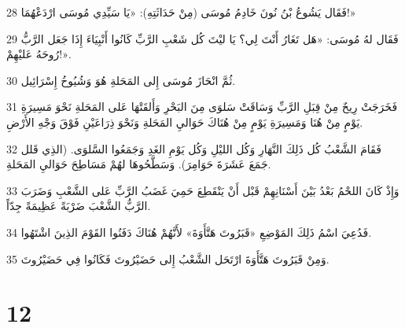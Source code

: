 \par 28 فَقَال يَشُوعُ بْنُ نُونَ خَادِمُ مُوسَى (مِنْ حَدَاثَتِهِ): «يَا سَيِّدِي مُوسَى ارْدَعْهُمَا!»
\par 29 فَقَال لهُ مُوسَى: «هَل تَغَارُ أَنْتَ لِي؟ يَا ليْتَ كُل شَعْبِ الرَّبِّ كَانُوا أَنْبِيَاءَ إِذَا جَعَل الرَّبُّ رُوحَهُ عَليْهِمْ!».
\par 30 ثُمَّ انْحَازَ مُوسَى إِلى المَحَلةِ هُوَ وَشُيُوخُ إِسْرَائِيل.
\par 31 فَخَرَجَتْ رِيحٌ مِنْ قِبَلِ الرَّبِّ وَسَاقَتْ سَلوَى مِنَ البَحْرِ وَأَلقَتْهَا عَلى المَحَلةِ نَحْوَ مَسِيرَةِ يَوْمٍ مِنْ هُنَا وَمَسِيرَةِ يَوْمٍ مِنْ هُنَاكَ حَوَاليِ المَحَلةِ وَنَحْوَ ذِرَاعَيْنِ فَوْقَ وَجْهِ الأَرْضِ.
\par 32 فَقَامَ الشَّعْبُ كُل ذَلِكَ النَّهَارِ وَكُل الليْلِ وَكُل يَوْمِ الغَدِ وَجَمَعُوا السَّلوَى. (الذِي قَلل جَمَعَ عَشَرَةَ حَوَامِرَ). وَسَطَّحُوهَا لهُمْ مَسَاطِحَ حَوَاليِ المَحَلةِ.
\par 33 وَإِذْ كَانَ اللحْمُ بَعْدُ بَيْنَ أَسْنَانِهِمْ قَبْل أَنْ يَنْقَطِعَ حَمِيَ غَضَبُ الرَّبِّ عَلى الشَّعْبِ وَضَرَبَ الرَّبُّ الشَّعْبَ ضَرْبَةً عَظِيمَةً جِدّاً.
\par 34 فَدُعِيَ اسْمُ ذَلِكَ المَوْضِعِ «قَبَرُوتَ هَتَّأَوَةَ» لأَنَّهُمْ هُنَاكَ دَفَنُوا القَوْمَ الذِينَ اشْتَهُوا.
\par 35 وَمِنْ قَبَرُوتَ هَتَّأَوَةَ ارْتَحَل الشَّعْبُ إِلى حَضَيْرُوتَ فَكَانُوا فِي حَضَيْرُوتَ.

\chapter{12}

